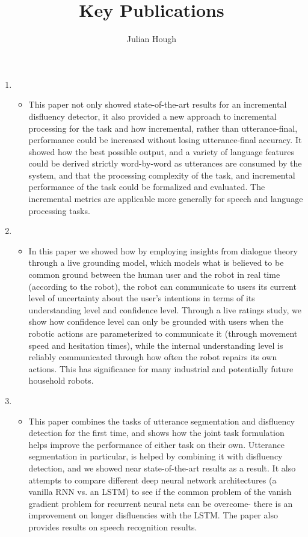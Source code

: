 \documentclass[12pt]{article}
\title{Key Publications}
\author{Julian Hough}
\begin{document}
\maketitle


\begin{enumerate}
\item{}
\begin{itemize}
\item[] This paper not only showed state-of-the-art results for an incremental disfluency detector, it also provided a new approach to incremental processing for the task and how incremental, rather than utterance-final, performance could be increased without losing utterance-final accuracy. It showed how the best possible output, and a variety of language features could be derived strictly word-by-word as utterances are consumed by the system, and that the processing complexity of the task, and incremental performance of the task could be formalized and evaluated. The incremental metrics are applicable more generally for speech and language processing tasks.
\end{itemize}

\item{}\begin{itemize}
\item[]In this paper we showed how by employing insights from dialogue theory through a live grounding model, which models what is believed to be common ground between the human user and the robot in real time (according to the robot), the robot can communicate to users its current level of uncertainty about the user's intentions in terms of its understanding level and confidence level. Through a live ratings study, we show how confidence level can only be grounded with users when the robotic actions are parameterized to communicate it (through movement speed and hesitation times), while the internal understanding level is reliably communicated through how often the robot repairs its own actions. This has significance for many industrial and potentially future household robots.
\end{itemize}

\item{}\begin{itemize}
\item[]This paper combines the tasks of utterance segmentation and disfluency detection for the first time, and shows how the joint task formulation helps improve the performance of either task on their own. Utterance segmentation in particular, is helped by combining it with disfluency detection, and we showed near state-of-the-art results as a result. It also attempts to compare different deep neural network architectures (a vanilla RNN vs. an  LSTM) to see if the common problem of the vanish gradient problem for recurrent neural nets can be overcome- there is an improvement on longer disfluencies with the LSTM. The paper also provides results on speech recognition results.
\end{itemize}


\end{enumerate}
\end{document}
